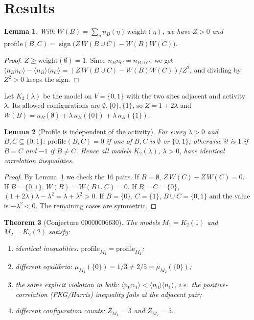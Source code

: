 \documentclass[11pt]{article}
\newtheorem{theorem}{Theorem}
\newtheorem{lemma}[theorem]{Lemma}
\theoremstyle{definition}
\theoremstyle{remark}
\renewcommand{\_}{\oldus\allowbreak}
\begin{document}
\section{Results}

\begin{lemma}\label{lem:sign}
With $W(B)=\sum_\eta n_B(\eta)\,\mathrm{weight}(\eta)$, we have $Z>0$ and
$\mathrm{profile}(B,C)=\operatorname{sign}\bigl(Z\,W(B\cup C)-W(B)W(C)\bigr)$.
\end{lemma}

\begin{proof}
$Z\ge\mathrm{weight}(\emptyset)=1$. Since $n_Bn_C=n_{B\cup C}$, we get $\langle n_Bn_C\rangle-\langle
n_B\rangle\langle n_C\rangle=(Z\,W(B\cup C)-W(B)W(C))/Z^2$, and dividing by $Z^2>0$ keeps the sign.
\end{proof}

Let $K_2(\lambda)$ be the model on $V=\{0,1\}$ with the two sites adjacent and activity $\lambda$.
Its allowed configurations are $\emptyset,\{0\},\{1\}$, so $Z=1+2\lambda$ and
$W(B)=n_B(\emptyset)+\lambda\,n_B(\{0\})+\lambda\,n_B(\{1\})$.

\begin{lemma}[Profile is independent of the activity]\label{lem:profile}
For every $\lambda>0$ and $B,C\subseteq\{0,1\}$: $\mathrm{profile}(B,C)=0$ if one of $B,C$ is
$\emptyset$ or $\{0,1\}$; otherwise it is $1$ if $B=C$ and $-1$ if $B\ne C$. Hence all models
$K_2(\lambda)$, $\lambda>0$, have identical correlation inequalities.
\end{lemma}

\begin{proof}
By Lemma~\ref{lem:sign} we check the 16 pairs. If $B=\emptyset$, $Z\,W(C)-Z\,W(C)=0$. If
$B=\{0,1\}$, $W(B)=W(B\cup C)=0$. If $B=C=\{0\}$, $(1+2\lambda)\lambda-\lambda^2=\lambda+\lambda^2>0$.
If $B=\{0\}$, $C=\{1\}$, $B\cup C=\{0,1\}$ and the value is $-\lambda^2<0$. The remaining cases are
symmetric.
\end{proof}

\begin{theorem}[Conjecture 00000006630]\label{thm:main}
The models $M_1=K_2(1)$ and $M_2=K_2(2)$ satisfy:
\begin{enumerate}[nosep]
\item identical inequalities: $\mathrm{profile}_{M_1}=\mathrm{profile}_{M_2}$;
\item different equilibria: $\mu_{M_1}(\{0\})=1/3\ne 2/5=\mu_{M_2}(\{0\})$;
\item the same explicit violation in both: $\langle n_0n_1\rangle<\langle n_0\rangle\langle
n_1\rangle$, i.e.\ the positive-correlation (FKG/Harris) inequality fails at the adjacent pair;
\item different configuration counts: $Z_{M_1}=3$ and $Z_{M_2}=5$.
\end{enumerate}
\end{theorem}
\end{document}
